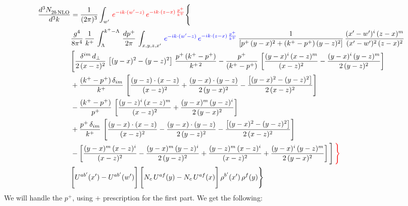 \documentclass[9pt]{article}
\numberwithin{equation}{section}
\begin{document}
\begin{align}
 \frac{d^{3}N_{2b\,\rm NLO}^{\rm}}{d^{3}k}  & =   \frac{1}{(2\pi)^{3}}  \int_{w^\prime}\, {\color{red}e^{-ik\cdot(w'-z)}\,e^{-ik\cdot (z-x)\,\frac{p^{+}}{k^{+}}}} \Bigg\{\notag \\ & \frac{g^{4}}{8\pi^{4}}\,\frac{1}{k^{+}}\,\int_{\Lambda}^{k^{+}-\Lambda}\, \frac{dp^{+}}{2\pi} \, \int_{x,y,z,x'}\,{\color{blue}e^{-ik\cdot(w'-z)}\,e^{-ik\cdot (z-x)\,\frac{p^{+}}{k^{+}}}}\,\frac{1}{\left[p^{+}\,(y-x)^{2}+(k^{+}-p^{+})\,(y-z)^{2}\right]}\, \frac{(x'-w')^{i}\,(z-x)^{m}}{(x'-w')^{2}\,(z-x)^{2}} \notag \\ & \Bigg[\frac{\delta^{im}\,d_{\perp}}{2\,(x-z)^{2}}\,\left[(y-x)^{2}-(y-z)^{2}\right]\,\frac{p^{+}\,(k^{+}-p^{+})}{k^{+\,2}}-\frac{p^{+}}{(k^{+}-p^{+})}\,\left[\frac{(y-x)^{i}\,(x-z)^{m}}{(x-z)^{2}}-\frac{(y-x)^{i}\,(y-z)^{m}}{2\,(y-z)^{2}}\right]\notag \\ & +\frac{(k^{+}-p^{+})\,\delta_{im}}{k^{+}}\,\left[\frac{(y-z)\cdot (x-z)}{(x-z)^{2}}+\frac{(y-x)\cdot (y-z)}{2\,(y-x)^{2}}-\frac{\left[(y-x)^{2}-(y-z)^{2}\right]}{2\,(x-z)^{2}}\right]\notag \\ & -\frac{(k^{+}-p^{+})}{p^{+}}\,\left[\frac{(y-z)^{i}\,(x-z)^{m}}{(x-z)^{2}}+\frac{(y-x)^{m}\,(y-z)^{i}}{2\,(y-x)^{2}}\right]\notag \\ & +\frac{p^{+}\,\delta_{im}}{k^{+}}\,\left[\frac{(y-x)\cdot (x-z)}{(x-z)^{2}}-\frac{(y-x)\cdot (y-z)}{2\,(y-z)^{2}}-\frac{\left[(y-x)^{2}-(y-z)^{2}\right]}{2\,(x-z)^{2}}\right]\notag \\ &-\left[\frac{(y-x)^{m}\,(x-z)^{i}}{(x-z)^{2}}-\frac{(y-x)^{m}\,(y-z)^{i}}{2\,(y-z)^{2}}+\frac{(y-z)^{m}\,(x-z)^{i}}{(x-z)^{2}}+\frac{(y-x)^{i}\,(y-z)^{m}}{2\,(y-x)^{2}}\right]\Bigg]\,{\color{red}\Bigg\}} \notag \\ & \Bigg[U^{ab'}(x')-U^{ab'}(w')\Bigg]\,\Bigg[N_{c}\,U^{af}(y) -N_{c}\,U^{af}(x)\Bigg]\,\rho^{b'}(x')\,\rho^{f}(y)\Bigg\}
\end{align}
We will handle the $p^{+}$, using $+$ prescription for the first part. We get the following: 
\end{document}
